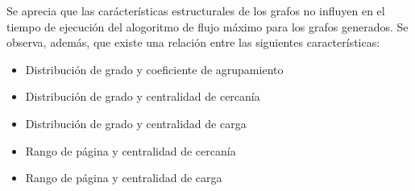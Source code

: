 \documentclass{article}
\begin{document}
Se aprecia que las carácterísticas estructurales de los grafos no influyen en el tiempo de ejecución del alogoritmo de flujo máximo para los grafos generados. 
Se observa, además, que existe una relación entre las siguientes características:


\begin{itemize}
\item Distribución de grado y coeficiente de agrupamiento 
\item Distribución de grado y centralidad de cercanía
\item Distribución de grado y centralidad de carga
\item Rango de página y centralidad de cercanía
\item Rango de página y centralidad de carga
\end{itemize}

\newpage
\end{document}
